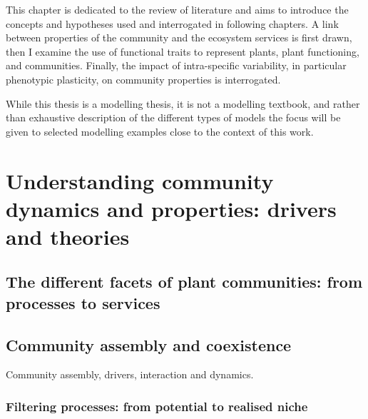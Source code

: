 \begin{fullwidth}
This chapter is dedicated to the review of literature and aims to introduce the concepts and hypotheses used and interrogated in following chapters. A link between properties of the community and the ecosystem services is first drawn, then I examine the use of functional traits to represent plants, plant functioning, and communities. Finally, the impact of intra-specific variability, in particular phenotypic plasticity, on community properties is interrogated.

While this thesis is a modelling thesis, it is not a modelling textbook, and rather than exhaustive description of the different types of models the focus will be given to selected modelling examples close to the context of this work.
\end{fullwidth}

\chapter{Understanding community dynamics and properties: drivers and theories}

\section{The different facets of plant communities: from processes to services}




\section{Community assembly and coexistence}

Community assembly, drivers, interaction and dynamics.


\subsection{Filtering processes: from potential to realised niche}


